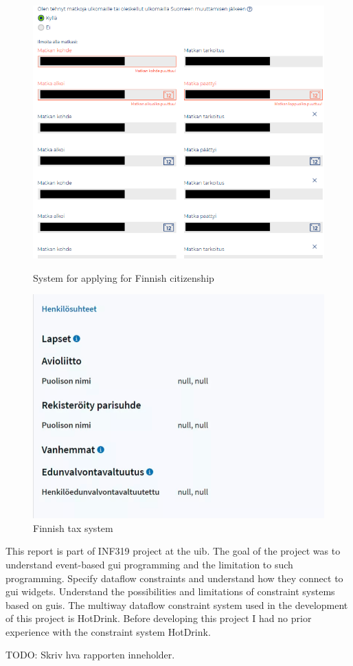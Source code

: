 \begin{figure}
    \caption{System for applying for Finnish citizenship}
    \centering
    \includegraphics[scale=0.55]{figures/enterfinland-ui-citizenship-cant-remove-first-trip.png}
    \label{fig:enterfinland}
\end{figure}



\begin{figure}
    \centering
    \includegraphics[scale=0.45]{figures/finnishSkatteetaten.png}
    \caption{Finnish tax system}
\end{figure}



This report is part of INF319 project at the \gls{uib}. The goal of the project was to understand event-based \gls{gui} programming and the limitation to such programming. Specify dataflow constraints and understand how they connect to \gls{gui} widgets. Understand the possibilities and limitations of constraint systems based on \gls{gui}s. The multiway dataflow constraint system used in the development of this project is HotDrink. Before developing this project I had no prior experience with the constraint system HotDrink. 

TODO: Skriv hva rapporten inneholder.
